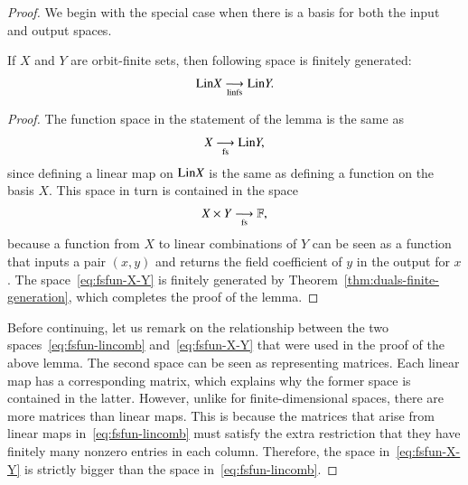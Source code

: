 \begin{proof}
    We begin with the special case when there is a basis for both the input and output spaces.
    \begin{lemma}
        If $X$ and $Y$ are orbit-finite sets, then following space is finitely generated:
        \begin{align*}
        \mathrm{Lin} X \underset{\text{linfs}}{\longrightarrow} \mathrm{Lin} Y.
        \end{align*}
    \end{lemma}
    \begin{proof}
        The function space in the statement of the lemma is the same as 
        \begin{align}\label{eq:fsfun-lincomb}
        X \underset{\text{fs}}{\longrightarrow} \mathrm{Lin} Y,
        \end{align}
        since defining a linear map on $\mathrm{Lin} X$ is the same as defining a function on the basis $X$. This space in turn is contained in the space 
        \begin{align}
            \label{eq:fsfun-X-Y}
        X \times Y  \underset{\text{fs}}{\longrightarrow} \mathbb F,
        \end{align}
        because a function from $X$ to linear combinations of $Y$ can be seen as a function that inputs a pair $(x,y)$ and returns the field coefficient of $y$ in the output for $x$. The space~\eqref{eq:fsfun-X-Y} is finitely generated by Theorem~\ref{thm:duals-finite-generation}, which completes the proof of the lemma. 
    \end{proof}


        
    Before continuing, let us remark on the relationship between the two spaces~\eqref{eq:fsfun-lincomb} and~\eqref{eq:fsfun-X-Y} that were used in the proof of the above lemma. The second space can be seen as representing matrices. Each linear map has a corresponding matrix, which explains why the former space is contained in the latter. However, unlike for finite-dimensional spaces, there are more matrices than linear maps. This is because the matrices that arise from linear maps in~\eqref{eq:fsfun-lincomb} must satisfy the extra restriction that they have finitely many nonzero entries in each column. Therefore, the space in~\eqref{eq:fsfun-X-Y} is strictly bigger than the space in~\eqref{eq:fsfun-lincomb}.
    

\end{proof}
